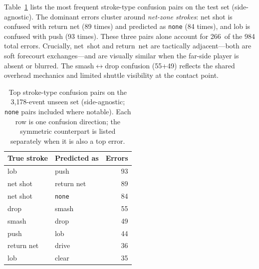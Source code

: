 Table~\ref{tab:top_confusions} lists the most frequent stroke-type
confusion pairs on the test set (side-agnostic). The dominant errors
cluster around \emph{net-zone strokes}: net shot is confused with return
net (89 times) and predicted as \texttt{none} (84 times), and lob is
confused with push (93 times). These three pairs alone account for
266~of the 984 total errors. Crucially, net~shot and return~net are
tactically adjacent---both are soft forecourt exchanges---and are
visually similar when the far-side player is absent or blurred.
The smash$\leftrightarrow$drop confusion (55+49) reflects the shared
overhead mechanics and limited shuttle visibility at the contact point.

\begin{table}[t]
  \caption{Top stroke-type confusion pairs on the 3{,}178-event unseen
  set (side-agnostic; \texttt{none} pairs included where notable).
  Each row is one confusion direction; the symmetric counterpart is
  listed separately when it is also a top error.}
  \label{tab:top_confusions}
  \centering
  \small
  \begin{tabular}{llr}
    \toprule
    True stroke & Predicted as & Errors \\
    \midrule
    lob         & push              & 93 \\
    net shot    & return net        & 89 \\
    net shot    & \texttt{none}     & 84 \\
    drop        & smash             & 55 \\
    smash       & drop              & 49 \\
    push        & lob               & 44 \\
    return net  & drive             & 36 \\
    lob         & clear             & 35 \\
    \bottomrule
  \end{tabular}
\end{table}
